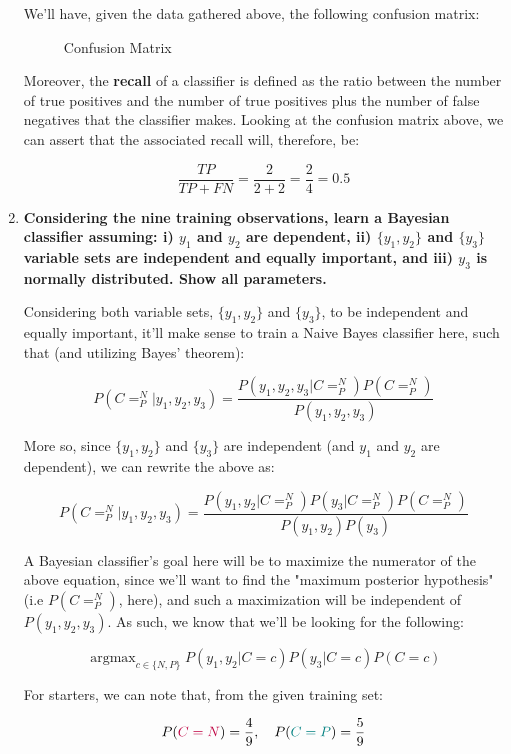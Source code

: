 \documentclass[12pt]{article}
\begin{document}
\begin{enumerate}[leftmargin=\labelsep]
  We'll have, given the data gathered above, the following confusion matrix:

  \begin{figure}[H]
    \centering
    
    \caption{Confusion Matrix}
  \end{figure}

  Moreover, the \textbf{recall} of a classifier is defined as the ratio between the number of
  true positives and the number of true positives plus the number of false negatives that the
  classifier makes. Looking at the confusion matrix above, we can assert that the associated
  recall will, therefore, be:

  $$
  \frac{TP}{TP + FN} = \frac{2}{2 + 2} = \frac{2}{4} = 0.5
  $$

  \pagebreak

  \item \textbf{Considering the nine training observations, learn a Bayesian classifier assuming:
  i) $y_1$ and $y_2$ are dependent, ii) $\{y_1 , y_2\}$ and $\{y_3 \}$ variable sets are
  independent and equally important, and iii) $y_3$ is normally distributed. Show all parameters.}

  Considering both variable sets, $\{y_1, y_2\}$ and $\{y_3\}$, to be independent and equally important,
  it'll make sense to train a Naive Bayes classifier here, such that (and utilizing
  Bayes' theorem):

  $$
  P(C = ^N_P | y_1, y_2, y_3) = \frac{P(y_1, y_2, y_3 | C = ^N_P) P(C = ^N_P)}{P(y_1, y_2, y_3)}
  $$

  More so, since $\{y_1, y_2\}$ and $\{y_3\}$ are independent (and $y_1$ and $y_2$ are dependent),
  we can rewrite the above as:

  $$
  P(C = ^N_P | y_1, y_2, y_3) = \frac{P(y_1, y_2 | C = ^N_P) P(y_3 | C = ^N_P) P(C = ^N_P)}{P(y_1, y_2) P(y_3)}
  $$

  A Bayesian classifier's goal here will be to maximize the numerator of the above equation,
  since we'll want to find the "maximum posterior hypothesis" (i.e $P(C = ^N_P)$, here), and
  such a maximization will be independent of $P(y_1, y_2, y_3)$. As such, we know that
  we'll be looking for the following:

  $$
  \operatorname{argmax}_{c \in \{N, P\}} P(y_1, y_2 | C = c) P(y_3 | C = c) P(C = c)
  $$

  For starters, we can note that, from the given training set:
  
  $$
  P(\textcolor{purple}{C = N}) = \frac{4}{9}, \quad P(\textcolor{teal}{C = P}) = \frac{5}{9}
  $$


\end{enumerate}
\end{document}

